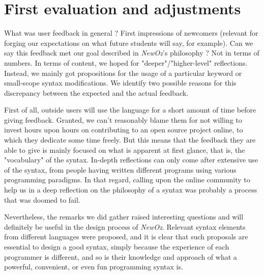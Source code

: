 \section{First evaluation and adjustments}\label{sec:ch4-adjustments}
What was user feedback in general ?
First impressions of newcomers (relevant for forging our expectations on what future students will say, for example).\newline
Can we say this feedback met our goal described in \textit{NewOz}'s philosophy ?
Not in terms of numbers.
In terms of content, we hoped for "deeper"/"higher-level" reflections.
Instead, we mainly got propositions for the usage of a particular keyword or small-scope syntax modifications.\newline
We identify two possible reasons for this discrepancy between the expected and the actual feedback.\newline

First of all, outside users will use the language for a short amount of time before giving feedback.
Granted, we can't reasonably blame them for not willing to invest hours upon hours on contributing to an open source project online, to which they dedicate some time freely.
But this means that the feedback they are able to give is mainly focused on what is apparent at first glance, that is, the "vocabulary" of the syntax.
In-depth reflections can only come after extensive use of the syntax, from people having written different programs using various programming paradigms.
In that regard, calling upon the online community to help us in a deep reflection on the philosophy of a syntax was probably a process that was doomed to fail.\newline

Nevertheless, the remarks we did gather raised interesting questions and will definitely be useful in the design process of \textit{NewOz}.
Relevant syntax elements from different languages were proposed, and it is clear that such proposals are essential to design a good syntax, simply because the experience of each programmer is different, and so is their knowledge and approach of what a powerful, convenient, or even fun programming syntax is.


